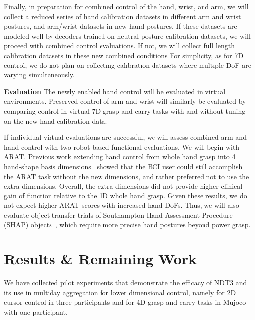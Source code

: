 \documentclass[12pt,oneside]{report}
\begin{document}
Finally, in preparation for combined control of the hand, wrist, and arm, we will collect a reduced series of hand calibration datasets in different arm and wrist postures, and arm/wrist datasets in new hand postures. If these datasets are modeled well by decoders trained on neutral-posture calibration datasets, we will proceed with combined control evaluations. If not, we will collect full length calibration datasets in these new combined conditions For simplicity, as for 7D control, we do not plan on collecting calibration datasets where multiple DoF are varying simultaneously.

\textbf{Evaluation} The newly enabled hand control will be evaluated in virtual environments. Preserved control of arm and wrist will similarly be evaluated by comparing control in virtual 7D grasp and carry tasks with and without tuning on the new hand calibration data.

If individual virtual evaluations are successful, we will assess combined arm and hand control with two robot-based functional evaluations. We will begin with ARAT. Previous work extending hand control from whole hand grasp into 4 hand-shape basis dimensions~\citep{wodlinger_15_10d} showed that the BCI user could still accomplish the ARAT task without the new dimensions, and rather preferred not to use the extra dimensions. Overall, the extra dimensions did not provide higher clinical gain of function relative to the 1D whole hand grasp. Given these results, we do not expect higher ARAT scores with increased hand DoFs. Thus, we will also evaluate object transfer trials of Southampton Hand Assessment Procedure (SHAP) objects~\citep{kyberd2009southampton}, which require more precise hand postures beyond power grasp.

\section{Results \& Remaining Work}
We have collected pilot experiments that demonstrate the efficacy of NDT3 and its use in multiday aggregation for lower dimensional control, namely for 2D cursor control in three participants and for 4D grasp and carry tasks in Mujoco with one participant.
\end{document}
